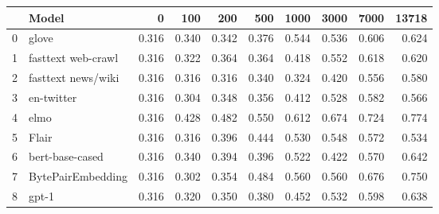 \begin{tabular}{llrrrrrrrr}
\toprule
{} &               Model &     0 &   100 &   200 &   500 &  1000 &  3000 &  7000 &  13718 \\
\midrule
0 &               glove & 0.316 & 0.340 & 0.342 & 0.376 & 0.544 & 0.536 & 0.606 &  0.624 \\
1 &  fasttext web-crawl & 0.316 & 0.322 & 0.364 & 0.364 & 0.418 & 0.552 & 0.618 &  0.620 \\
2 &  fasttext news/wiki & 0.316 & 0.316 & 0.316 & 0.340 & 0.324 & 0.420 & 0.556 &  0.580 \\
3 &          en-twitter & 0.316 & 0.304 & 0.348 & 0.356 & 0.412 & 0.528 & 0.582 &  0.566 \\
4 &                elmo & 0.316 & 0.428 & 0.482 & 0.550 & 0.612 & 0.674 & 0.724 &  0.774 \\
5 &               Flair & 0.316 & 0.316 & 0.396 & 0.444 & 0.530 & 0.548 & 0.572 &  0.534 \\
6 &     bert-base-cased & 0.316 & 0.340 & 0.394 & 0.396 & 0.522 & 0.422 & 0.570 &  0.642 \\
7 &   BytePairEmbedding & 0.316 & 0.302 & 0.354 & 0.484 & 0.560 & 0.560 & 0.676 &  0.750 \\
8 &               gpt-1 & 0.316 & 0.320 & 0.350 & 0.380 & 0.452 & 0.532 & 0.598 &  0.638 \\
\bottomrule
\end{tabular}
